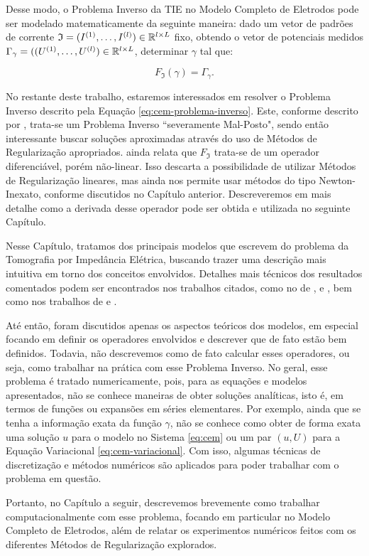 Desse modo, o Problema Inverso da TIE no Modelo Completo de Eletrodos pode ser modelado matematicamente da seguinte maneira: dado um vetor de padrões de corrente $\mathfrak I = (I^{(1)},\dots,I^{(l)})\in\mathbb{R}^{l \times L}$ fixo, obtendo o vetor de potenciais medidos $\Gamma_\gamma = ((U^{(1)},\dots,U^{(l)}) \in \mathbb{R}^{l \times L}$, determinar $\gamma$ tal que:

\begin{equation} \label{eq:cem-problema-inverso}
    F_{\mathfrak I}(\gamma) = \Gamma_\gamma.
\end{equation}


No restante deste trabalho, estaremos interessados em resolver o Problema Inverso descrito pela Equação \eqref{eq:cem-problema-inverso}. Este, conforme descrito por , trata-se um Problema Inverso ``severamente Mal-Posto", sendo então interessante buscar soluções aproximadas através do uso de Métodos de Regularização apropriados.  ainda relata que $F_{\mathfrak I}$ trata-se de um operador diferenciável, porém não-linear. Isso descarta a possibilidade de utilizar Métodos de Regularização lineares, mas ainda nos permite usar métodos do tipo Newton-Inexato, conforme discutidos no Capítulo anterior. Descreveremos em mais detalhe como a derivada desse operador pode ser obtida e utilizada no seguinte Capítulo.

Nesse Capítulo, tratamos dos principais modelos que escrevem do problema da Tomografia por Impedância Elétrica, buscando trazer uma descrição mais intuitiva em torno dos conceitos envolvidos. Detalhes mais técnicos dos resultados comentados podem ser encontrados nos trabalhos citados, como no de ,  e , bem como nos trabalhos de  e . 

Até então, foram discutidos apenas os aspectos teóricos dos modelos, em especial focando em definir os operadores envolvidos e descrever que de fato estão bem definidos. Todavia, não descrevemos como de fato calcular esses operadores, ou seja, como trabalhar na prática com esse Problema Inverso. No geral, esse problema é tratado numericamente, pois, para as equações e modelos apresentados, não se conhece maneiras de obter soluções analíticas, isto é, em termos de funções ou expansões em séries elementares. Por exemplo, ainda que se tenha a informação exata da função $\gamma$, não se conhece como obter de forma exata uma solução $u$ para o modelo no Sistema \eqref{eq:cem} ou um par $(u,U)$ para a Equação Variacional \eqref{eq:cem-variacional}. Com isso, algumas técnicas de discretização e métodos numéricos são aplicados para poder trabalhar com o problema em questão. 

Portanto, no Capítulo a seguir, descrevemos brevemente como trabalhar computacionalmente com esse problema, focando em particular no Modelo Completo de Eletrodos, além de relatar os experimentos numéricos feitos com os diferentes Métodos de Regularização explorados.